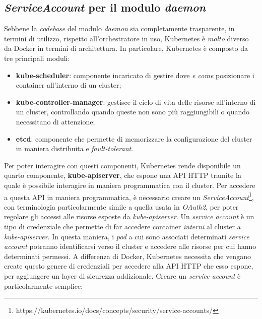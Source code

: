 \subsection{\textit{ServiceAccount} per il modulo \textit{daemon}}
Sebbene la \textit{codebase} del modulo \textit{daemon} sia completamente trasparente, in termini di utilizzo, rispetto all'orchestratore in uso, Kubernetes è \textit{molto} diverso da Docker in termini di architettura.
\newline
In particolare, Kubernetes è composto da tre principali moduli:
\begin{itemize}
    \item \textbf{kube-scheduler}: componente incaricato di gestire dove \textit{e come} posizionare i container all'interno di un cluster;
    \item \textbf{kube-controller-manager}: gestisce il ciclo di vita delle risorse all'interno di un cluster, controllando quando queste non sono più raggiungibili o quando necessitano di attenzione;
    \item \textbf{etcd}: componente che permette di memorizzare la configurazione del cluster in maniera distribuita e \textit{fault-tolerant}.
\end{itemize}
Per poter interagire con questi componenti, Kubernetes rende disponibile un quarto componente, \textbf{kube-apiserver}, che espone una API HTTP tramite la quale è possibile interagire in maniera programmatica con il cluster.
\newline
Per accedere a questa API in maniera programmatica, è necessario creare un \textit{ServiceAccount}\footnote{https://kubernetes.io/docs/concepts/security/service-accounts/}, con terminologia particolarmente simile a quella usata in \textit{OAuth2}, per poter regolare gli accessi alle risorse esposte da \textit{kube-apiserver}.
\newline
Un \textit{service account} è un tipo di credenziale che permette di far accedere container \textit{interni} al cluster a \textit{kube-apiserver}. In questa maniera, i \textit{pod} a cui sono associati determinati \textit{service account} potranno identificarsi verso il cluster e accedere alle risorse per cui hanno determinati permessi.
\newline
A differenza di Docker, Kubernetes necessita che vengano create questo genere di credenziali per accedere alla API HTTP che esso espone, per aggiungere un layer di sicurezza addizionale.
\newline
Creare un \textit{service account} è particolarmente semplice:
